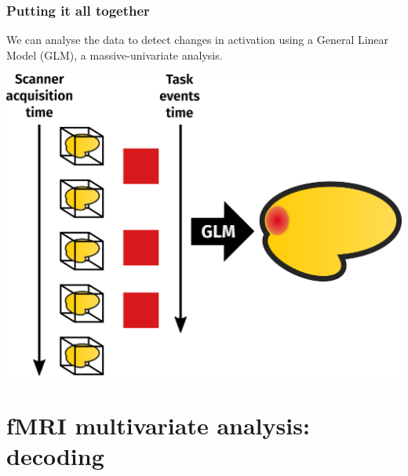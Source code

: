 \documentclass[11pt]{beamer}
\begin{document}
\begin{frame}
    \frametitle{Putting it all together}
    
    We can analyse the data to detect changes in activation using a General
    Linear Model (GLM), a massive-univariate analysis.

    \begin{center}
        \includegraphics[scale=0.15]{figures/glm.png}
    \end{center}

\end{frame}

\section{fMRI multivariate analysis: decoding}
\label{sec:Decoding}
\end{document}
